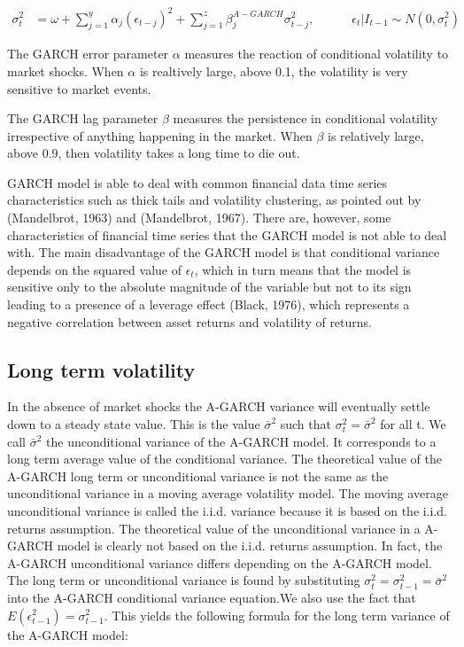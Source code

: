 \begin{align}
    \sigma_t^2 &= \omega + \sum_{j=1}^y\alpha_j(\epsilon_{t-j})^2+\sum_{j=1}^z\beta_j^{A-GARCH}\sigma_{t-j}^2,\quad\quad\quad \epsilon_t | I_{t-1} \sim N(0,{\sigma_t^2}) \label{ConditionalVolatilityEquation}
\end{align}

The GARCH error parameter $\alpha$ measures the reaction of conditional volatility to market shocks. When $\alpha$ is realtively large, above 0.1, the volatility is very sensitive to market events.

The GARCH lag parameter $\beta$ measures the persistence in conditional volatility irrespective of anything happening in the market. When $\beta$ is relatively large, above 0.9, then volatility takes a long time to die out.

GARCH model is able to deal with common financial data time series characteristics such as thick tails and volatility clustering, as pointed out by (Mandelbrot, 1963) and (Mandelbrot, 1967). There are, however, some characteristics of financial time series that the GARCH model is not able to deal with. The main disadvantage of the GARCH model is that conditional variance depends on the squared value of $\epsilon_t$, which in turn means that the model is sensitive only to the absolute magnitude of the variable but not to its sign leading to a presence of a leverage effect (Black, 1976), which represents a negative
correlation between asset returns and volatility of returns.

\subsection*{Long term volatility}

In the absence of market shocks the A-GARCH variance will eventually settle down to a steady state value. This is the value $\bar{\sigma}^2$ such that ${\sigma_t^2} = \bar{\sigma}^2$ for all t. We call $\bar{\sigma}^2$ the unconditional variance of the A-GARCH model. It corresponds to a long term average value of the conditional variance. The theoretical value of the A-GARCH long term or unconditional variance is not the same as the unconditional variance in a moving average volatility model. The moving average unconditional variance is called the i.i.d. variance because it is based on the i.i.d. returns assumption. The theoretical value of the unconditional variance in a A-GARCH model is clearly not based on the i.i.d. returns assumption. In fact, the A-GARCH unconditional variance differs depending on the A-GARCH model. The long term or unconditional variance is found by substituting ${\sigma_t^2} = {\sigma_{t-1}^2} = \bar{\sigma}^2$ into the A-GARCH conditional variance equation.We also use the fact that $E(\epsilon_{t-1}^2)=\sigma_{t-1}^2$. This yields the following formula for the long term variance of the A-GARCH model:

